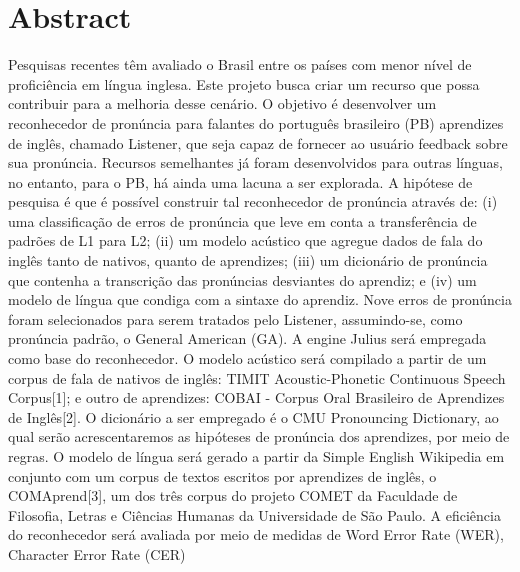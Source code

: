 \begingroup
\let\clearpage\relax
\let\cleardoublepage\relax
\let\cleardoublepage\relax

\chapter*{Abstract}

Pesquisas recentes t\^em avaliado o Brasil entre os pa\'ises com menor n\'ivel
de profici\^encia em l\'ingua inglesa. Este projeto busca criar um recurso
que possa contribuir para a melhoria desse cen\'ario. O objetivo \'e
desenvolver um reconhecedor de pron\'uncia para falantes do portugu\^es
brasileiro (PB) aprendizes de ingl\^es, chamado Listener, que seja capaz
de fornecer ao usu\'ario feedback sobre sua pron\'uncia. Recursos
semelhantes j\'a foram desenvolvidos para outras l\'inguas, no entanto, para
o PB, h\'a ainda uma lacuna a ser explorada. A hip\'otese de pesquisa \'e que
\'e poss\'ivel construir tal reconhecedor de pron\'uncia atrav\'es de: (i) uma
classifica\c{c}\~ao de erros de pron\'uncia que leve em conta a transfer\^encia de
padr\~oes de L1 para L2; (ii) um modelo ac\'ustico que agregue dados de fala
do ingl\^es tanto de nativos, quanto de aprendizes; (iii) um dicion\'ario de
pron\'uncia que contenha a transcri\c{c}\~ao das pron\'uncias desviantes do
aprendiz; e (iv) um modelo de l\'ingua que condiga com a sintaxe do
aprendiz. Nove erros de pron\'uncia foram selecionados para serem tratados
pelo Listener, assumindo-se, como pron\'uncia padr\~ao, o General American
(GA). A engine Julius ser\'a empregada como base do reconhecedor. O modelo
ac\'ustico ser\'a compilado a partir de um corpus de fala de nativos de
ingl\^es: TIMIT Acoustic-Phonetic Continuous Speech Corpus{[}1{]}; e outro
de aprendizes: COBAI - Corpus Oral Brasileiro de Aprendizes de
Ingl\^es{[}2{]}. O dicion\'ario a ser empregado \'e o CMU Pronouncing
Dictionary, ao qual ser\~ao acrescentaremos as hip\'oteses de pron\'uncia dos
aprendizes, por meio de regras. O modelo de l\'ingua ser\'a gerado a partir
da Simple English Wikipedia em conjunto com um corpus de textos escritos
por aprendizes de ingl\^es, o COMAprend{[}3{]}, um dos tr\^es corpus do
projeto COMET da Faculdade de Filosofia, Letras e Ci\^encias Humanas da
Universidade de S\~ao Paulo. A efici\^encia do reconhecedor ser\'a avaliada
por meio de medidas de Word Error Rate (WER), Character Error Rate (CER)

